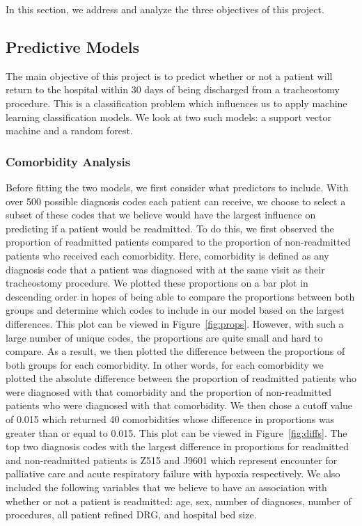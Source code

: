 \documentclass[sn-basic,pdflatex]{sn-jnl}
\theoremstyle{remark}
\theoremstyle{definition}
\begin{document}
In this section, we address and analyze the three objectives of this
project.

\hypertarget{sec4A}{%
\subsection{Predictive Models}\label{sec4A}}

The main objective of this project is to predict whether or not a
patient will return to the hospital within 30 days of being discharged
from a tracheostomy procedure. This is a classification problem which
influences us to apply machine learning classification models. We look
at two such models: a support vector machine and a random forest.

\hypertarget{sec4AA}{%
\subsubsection{Comorbidity Analysis}\label{sec4AA}}

Before fitting the two models, we first consider what predictors to
include. With over 500 possible diagnosis codes each patient can
receive, we choose to select a subset of these codes that we believe
would have the largest influence on predicting if a patient would be
readmitted. To do this, we first observed the proportion of readmitted
patients compared to the proportion of non-readmitted patients who
received each comorbidity. Here, comorbidity is defined as any diagnosis
code that a patient was diagnosed with at the same visit as their
tracheostomy procedure. We plotted these proportions on a bar plot in
descending order in hopes of being able to compare the proportions
between both groups and determine which codes to include in our model
based on the largest differences. This plot can be viewed in
Figure~\ref{fig:props}. \newline \newline However, with such a large
number of unique codes, the proportions are quite small and hard to
compare. As a result, we then plotted the difference between the
proportions of both groups for each comorbidity. In other words, for
each comorbidity we plotted the absolute difference between the
proportion of readmitted patients who were diagnosed with that
comorbidity and the proportion of non-readmitted patients who were
diagnosed with that comorbidity. We then chose a cutoff value of 0.015
which returned 40 comorbidities whose difference in proportions was
greater than or equal to 0.015. This plot can be viewed in
Figure~\ref{fig:diffs}. The top two diagnosis codes with the largest
difference in proportions for readmitted and non-readmitted patients is
Z515 and J9601 which represent encounter for palliative care and acute
respiratory failure with hypoxia respectively. \newline \newline We also
included the following variables that we believe to have an association
with whether or not a patient is readmitted: age, sex, number of
diagnoses, number of procedures, all patient refined DRG, and hospital
bed size.
\end{document}
